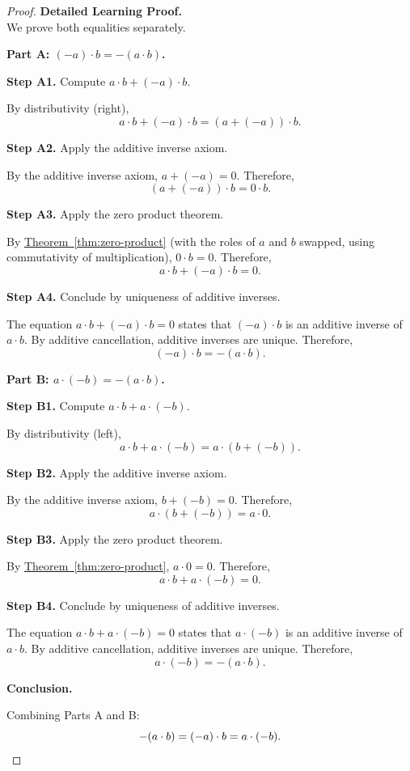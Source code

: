 \begin{proof}
\textbf{Detailed Learning Proof.}~\\

We prove both equalities separately.

\textbf{Part A: $(-a)\cdot b = -(a\cdot b)$.}

\textbf{Step A1.} Compute $a\cdot b + (-a)\cdot b$.

By distributivity (right),
\[
a\cdot b + (-a)\cdot b = (a + (-a))\cdot b.
\]

\textbf{Step A2.} Apply the additive inverse axiom.

By the additive inverse axiom, $a + (-a) = 0$.  Therefore,
\[
(a + (-a))\cdot b = 0\cdot b.
\]

\textbf{Step A3.} Apply the zero product theorem.

By \hyperref[thm:zero-product]{Theorem~\ref*{thm:zero-product}} (with the
roles of $a$ and $b$ swapped, using commutativity of multiplication),
$0\cdot b = 0$.  Therefore,
\[
a\cdot b + (-a)\cdot b = 0.
\]

\textbf{Step A4.} Conclude by uniqueness of additive inverses.

The equation $a\cdot b + (-a)\cdot b = 0$ states that $(-a)\cdot b$ is an
additive inverse of $a\cdot b$.  By additive cancellation, additive inverses
are unique.  Therefore,
\[
(-a)\cdot b = -(a\cdot b).
\]

\textbf{Part B: $a\cdot(-b) = -(a\cdot b)$.}

\textbf{Step B1.} Compute $a\cdot b + a\cdot(-b)$.

By distributivity (left),
\[
a\cdot b + a\cdot(-b) = a\cdot(b + (-b)).
\]

\textbf{Step B2.} Apply the additive inverse axiom.

By the additive inverse axiom, $b + (-b) = 0$.  Therefore,
\[
a\cdot(b + (-b)) = a\cdot 0.
\]

\textbf{Step B3.} Apply the zero product theorem.

By \hyperref[thm:zero-product]{Theorem~\ref*{thm:zero-product}},
$a\cdot 0 = 0$.  Therefore,
\[
a\cdot b + a\cdot(-b) = 0.
\]

\textbf{Step B4.} Conclude by uniqueness of additive inverses.

The equation $a\cdot b + a\cdot(-b) = 0$ states that $a\cdot(-b)$ is an
additive inverse of $a\cdot b$.  By additive cancellation, additive inverses
are unique.  Therefore,
\[
a\cdot(-b) = -(a\cdot b).
\]

\textbf{Conclusion.}

Combining Parts A and B:
\[
-(a\cdot b) = (-a)\cdot b = a\cdot(-b). \qedhere
\]
\end{proof}

